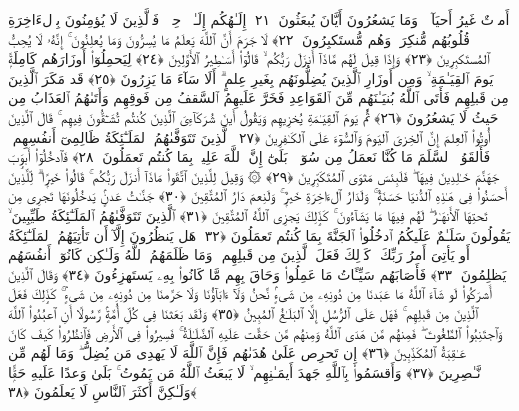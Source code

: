  أَموَٟتٌ غَيرُ أَحيَآءٍۢ ۖ وَمَا يَشعُرُونَ أَيَّانَ يُبعَثُونَ ﴿٢١﴾
 إِلَـٰهُكُم إِلَـٰهٌۭ وَٟحِدٌۭ ۚ فَٱلَّذِينَ لَا يُؤمِنُونَ بِٱلءَاخِرَةِ قُلُوبُهُم مُّنكِرَةٌۭ وَهُم مُّستَكبِرُونَ ﴿٢٢﴾
 لَا جَرَمَ أَنَّ ٱللَّهَ يَعلَمُ مَا يُسِرُّونَ وَمَا يُعلِنُونَ ۚ إِنَّهُۥ لَا يُحِبُّ ٱلمُستَكبِرِينَ ﴿٢٣﴾
 وَإِذَا قِيلَ لَهُم مَّاذَآ أَنزَلَ رَبُّكُم ۙ قَالُوٓا۟ أَسَـٰطِيرُ ٱلأَوَّلِينَ ﴿٢٤﴾
 لِيَحمِلُوٓا۟ أَوزَارَهُم كَامِلَةًۭ يَومَ ٱلقِيَـٰمَةِ ۙ وَمِن أَوزَارِ ٱلَّذِينَ يُضِلُّونَهُم بِغَيرِ عِلمٍ ۗ أَلَا سَآءَ مَا يَزِرُونَ ﴿٢٥﴾
 قَد مَكَرَ ٱلَّذِينَ مِن قَبلِهِم فَأَتَى ٱللَّهُ بُنيَـٰنَهُم مِّنَ ٱلقَوَاعِدِ فَخَرَّ عَلَيهِمُ ٱلسَّقفُ مِن فَوقِهِم وَأَتَىٰهُمُ ٱلعَذَابُ مِن حَيثُ لَا يَشعُرُونَ ﴿٢٦﴾
 ثُمَّ يَومَ ٱلقِيَـٰمَةِ يُخزِيهِم وَيَقُولُ أَينَ شُرَكَآءِىَ ٱلَّذِينَ كُنتُم تُشَـٰٓقُّونَ فِيهِم ۚ قَالَ ٱلَّذِينَ أُوتُوا۟ ٱلعِلمَ إِنَّ ٱلخِزىَ ٱليَومَ وَٱلسُّوٓءَ عَلَى ٱلكَـٰفِرِينَ ﴿٢٧﴾
 ٱلَّذِينَ تَتَوَفَّىٰهُمُ ٱلمَلَـٰٓئِكَةُ ظَالِمِىٓ أَنفُسِهِم ۖ فَأَلقَوُا۟ ٱلسَّلَمَ مَا كُنَّا نَعمَلُ مِن سُوٓءٍۭ ۚ بَلَىٰٓ إِنَّ ٱللَّهَ عَلِيمٌۢ بِمَا كُنتُم تَعمَلُونَ ﴿٢٨﴾
 فَٱدخُلُوٓا۟ أَبوَٟبَ جَهَنَّمَ خَـٰلِدِينَ فِيهَا ۖ فَلَبِئسَ مَثوَى ٱلمُتَكَبِّرِينَ ﴿٢٩﴾
 ۞ وَقِيلَ لِلَّذِينَ ٱتَّقَوا۟ مَاذَآ أَنزَلَ رَبُّكُم ۚ قَالُوا۟ خَيرًۭا ۗ لِّلَّذِينَ أَحسَنُوا۟ فِى هَـٰذِهِ ٱلدُّنيَا حَسَنَةٌۭ ۚ وَلَدَارُ ٱلءَاخِرَةِ خَيرٌۭ ۚ وَلَنِعمَ دَارُ ٱلمُتَّقِينَ ﴿٣٠﴾
 جَنَّـٰتُ عَدنٍۢ يَدخُلُونَهَا تَجرِى مِن تَحتِهَا ٱلأَنهَـٰرُ ۖ لَهُم فِيهَا مَا يَشَآءُونَ ۚ كَذَٟلِكَ يَجزِى ٱللَّهُ ٱلمُتَّقِينَ ﴿٣١﴾
 ٱلَّذِينَ تَتَوَفَّىٰهُمُ ٱلمَلَـٰٓئِكَةُ طَيِّبِينَ ۙ يَقُولُونَ سَلَـٰمٌ عَلَيكُمُ ٱدخُلُوا۟ ٱلجَنَّةَ بِمَا كُنتُم تَعمَلُونَ ﴿٣٢﴾
 هَل يَنظُرُونَ إِلَّآ أَن تَأتِيَهُمُ ٱلمَلَـٰٓئِكَةُ أَو يَأتِىَ أَمرُ رَبِّكَ ۚ كَذَٟلِكَ فَعَلَ ٱلَّذِينَ مِن قَبلِهِم ۚ وَمَا ظَلَمَهُمُ ٱللَّهُ وَلَـٰكِن كَانُوٓا۟ أَنفُسَهُم يَظلِمُونَ ﴿٣٣﴾
 فَأَصَابَهُم سَيِّـَٔاتُ مَا عَمِلُوا۟ وَحَاقَ بِهِم مَّا كَانُوا۟ بِهِۦ يَستَهزِءُونَ ﴿٣٤﴾
 وَقَالَ ٱلَّذِينَ أَشرَكُوا۟ لَو شَآءَ ٱللَّهُ مَا عَبَدنَا مِن دُونِهِۦ مِن شَىءٍۢ نَّحنُ وَلَآ ءَابَآؤُنَا وَلَا حَرَّمنَا مِن دُونِهِۦ مِن شَىءٍۢ ۚ كَذَٟلِكَ فَعَلَ ٱلَّذِينَ مِن قَبلِهِم ۚ فَهَل عَلَى ٱلرُّسُلِ إِلَّا ٱلبَلَـٰغُ ٱلمُبِينُ ﴿٣٥﴾
 وَلَقَد بَعَثنَا فِى كُلِّ أُمَّةٍۢ رَّسُولًا أَنِ ٱعبُدُوا۟ ٱللَّهَ وَٱجتَنِبُوا۟ ٱلطَّٰغُوتَ ۖ فَمِنهُم مَّن هَدَى ٱللَّهُ وَمِنهُم مَّن حَقَّت عَلَيهِ ٱلضَّلَـٰلَةُ ۚ فَسِيرُوا۟ فِى ٱلأَرضِ فَٱنظُرُوا۟ كَيفَ كَانَ عَـٰقِبَةُ ٱلمُكَذِّبِينَ ﴿٣٦﴾
 إِن تَحرِص عَلَىٰ هُدَىٰهُم فَإِنَّ ٱللَّهَ لَا يَهدِى مَن يُضِلُّ ۖ وَمَا لَهُم مِّن نَّـٰصِرِينَ ﴿٣٧﴾
 وَأَقسَمُوا۟ بِٱللَّهِ جَهدَ أَيمَـٰنِهِم ۙ لَا يَبعَثُ ٱللَّهُ مَن يَمُوتُ ۚ بَلَىٰ وَعدًا عَلَيهِ حَقًّۭا وَلَـٰكِنَّ أَكثَرَ ٱلنَّاسِ لَا يَعلَمُونَ ﴿٣٨﴾

